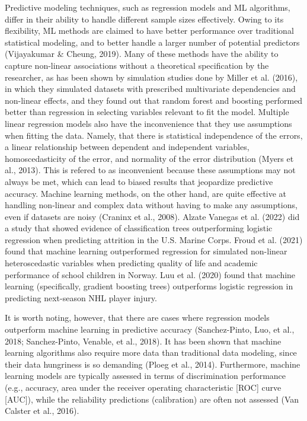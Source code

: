 \documentclass[
  jou]{apa6}
\begin{document}
Predictive modeling techniques, such as regression models and ML algorithms, differ in their ability to handle different sample sizes effectively.
Owing to its flexibility, ML methods are claimed to have better performance over traditional statistical modeling, and to better handle a larger number of potential predictors (Vijayakumar \& Cheung, 2019).
Many of these methods have the ability to capture non-linear associations without a theoretical specification by the researcher, as has been shown by simulation studies done by Miller et al. (2016), in which they simulated datasets with prescribed multivariate dependencies and non-linear effects, and they found out that random forest and boosting performed better than regression in selecting variables relevant to fit the model.
Multiple linear regression models also have the inconvenience that they use assumptions when fitting the data.
Namely, that there is statistical independence of the errors, a linear relationship between dependent and independent variables, homoscedasticity of the error, and normality of the error distribution (Myers et al., 2013).
This is refered to as inconvenient because these assumptions may not always be met, which can lead to biased results that jeopardize predictive accuracy.
Machine learning methods, on the other hand, are quite effective at handling non-linear and complex data without having to make any assumptions, even if datasets are noisy (Craninx et al., 2008).
Alzate Vanegas et al. (2022) did a study that showed evidence of classification trees outperforming logistic regression when predicting attrition in the U.S.
Marine Corps.
Froud et al. (2021) found that machine learning outperformed regression for simulated non-linear heteroscedastic variables when predicting quality of life and academic performance of school children in Norway.
Luu et al. (2020) found that machine learning (specifically, gradient boosting trees) outperforms logistic regression in predicting next-season NHL player injury.

It is worth noting, however, that there are cases where regression models outperform machine learning in predictive accuracy (Sanchez-Pinto, Luo, et al., 2018; Sanchez-Pinto, Venable, et al., 2018). It has been shown that machine learning algorithms also require more data than traditional data modeling, since their data hungriness is so demanding (Ploeg et al., 2014).
Furthermore, machine learning models are typically assessed in terms of discrimination performance (e.g., accuracy, area under the receiver operating characteristic {[}ROC{]} curve {[}AUC{]}), while the reliability predictions (calibration) are often not assessed (Van Calster et al., 2016).
\end{document}
